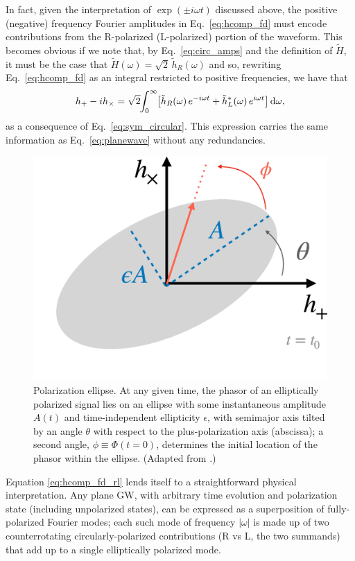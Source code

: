 \documentclass[aps,prd,twocolumn,superscriptaddress,preprintnumbers,floatfix,nofootinbib]{revtex4-2}
\newcommand{\infd}{\mathrm{d}}
\begin{document}
In fact, given the interpretation of $\exp(\pm i \omega t)$ discussed above, the positive (negative) frequency Fourier amplitudes in Eq.~\eqref{eq:hcomp_fd} must encode contributions from the R-polarized (L-polarized) portion of the waveform.
This becomes obvious if we note that, by Eq.~\eqref{eq:circ_amps} and the definition of $\tilde{H}$, it must be the case that $\tilde{H}(\omega) = \sqrt{2}\, \tilde{h}_R (\omega)$ and so, rewriting Eq.~\eqref{eq:hcomp_fd} as an integral restricted to positive frequencies, we have that
\begin{align} \label{eq:hcomp_fd_rl}
h_+ - i h_\times = \sqrt{2} \hspace{-2.5pt} \int_{0}^{\infty} \hspace{-2.5pt} \left[ \tilde{h}_R(\omega)\, e^{-i \omega t} + \tilde{h}_L^*(\omega)\, e^{i \omega t}\right] \infd \omega ,
\end{align}
as a consequence of Eq.~\eqref{eq:sym_circular}.
This expression carries the same information as Eq.~\eqref{eq:planewave} without any redundancies.

\begin{figure}
\includegraphics[width=0.6\columnwidth]{ellipse}
\caption{Polarization ellipse. At any given time, the phasor of an elliptically polarized signal lies on an ellipse with some instantaneous amplitude $A(t)$ and time-independent ellipticity $\epsilon$, with semimajor axis tilted by an angle $\theta$ with respect to the plus-polarization axis (abscissa); a second angle, $\phi \equiv \Phi(t=0)$, determines the initial location of the phasor within the ellipse. (Adapted from \cite{Isi:2021iql}.)}
\label{fig:ellipse}
\end{figure}

Equation \eqref{eq:hcomp_fd_rl} lends itself to a straightforward physical interpretation.
Any plane GW, with arbitrary time evolution and polarization state (including unpolarized states), can be expressed as a superposition of fully-polarized Fourier modes;
each such mode of frequency $|\omega|$ is made up of two counterrotating circularly-polarized contributions (R vs L, the two summands) that add up to a single elliptically polarized mode.
\end{document}
